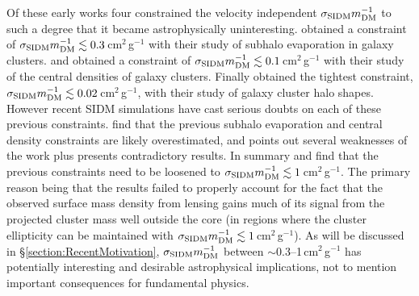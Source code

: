 Of these early works four constrained the velocity independent $\sigma_{\rm SIDM}m_{\rm DM}^{-1}$ to such a degree that it became astrophysically uninteresting.
\citet{Gnedin:2001gd} obtained a constraint of $\sigma_{\rm SIDM}m_{\rm DM}^{-1}\lesssim 0.3$\,cm$^2$\,g$^{-1}$ with their study of subhalo evaporation in galaxy clusters.
\citet{Yoshida:2000gn} and \citet{Meneghetti:2001en} obtained a constraint of $\sigma_{\rm SIDM}m_{\rm DM}^{-1}\lesssim 0.1$\,cm$^2$\,g$^{-1}$ with their study of the central densities of galaxy clusters.
Finally \citet{MiraldaEscude:2002ev} obtained the tightest constraint, $\sigma_{\rm SIDM}m_{\rm DM}^{-1}\lesssim 0.02$\,cm$^2$\,g$^{-1}$, with their study of galaxy cluster halo shapes.
However recent SIDM simulations \citep{Peter:2012vi, Rocha:2012tr} have cast serious doubts on each of these previous constraints.
\citet{Rocha:2012tr} find that the previous subhalo evaporation and central density constraints are likely overestimated, and \citet{Peter:2012vi} points out several weaknesses of the \citet{MiraldaEscude:2002ev} work plus presents contradictory results.
In summary \citet{Peter:2012vi} and \citet{Rocha:2012tr} find that the previous constraints need to be loosened to $\sigma_{\rm SIDM}m_{\rm DM}^{-1}\lesssim 1$\,cm$^2$\,g$^{-1}$.
The primary reason being that the \citet{MiraldaEscude:2002ev} results failed to properly account for the fact that the observed surface mass density from lensing gains much of its signal from the projected cluster mass well outside the core (in regions where the cluster ellipticity can be maintained with $\sigma_{\rm SIDM}m_{\rm DM}^{-1}\lesssim 1$\,cm$^2$\,g$^{-1}$).
As will be discussed in \S\ref{section:RecentMotivation},  $\sigma_{\rm SIDM}m_{\rm DM}^{-1}$ between $\sim$0.3--1\,cm$^2$\,g$^{-1}$ has potentially interesting and desirable astrophysical implications, not to mention important consequences for fundamental physics.

